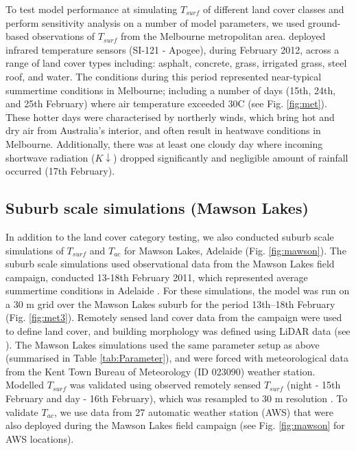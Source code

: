 \documentclass[gmd, manuscript]{copernicus}
\begin{document}
To test model performance at simulating $T_{surf}$ of different land cover classes and perform sensitivity analysis on a number of model parameters, we used ground-based observations of $T_{surf}$ from the Melbourne metropolitan area. \cite{Coutts2016a} deployed infrared temperature sensors (SI-121 - Apogee), during February 2012, across a range of land cover types including: asphalt, concrete, grass, irrigated grass, steel roof, and water. The conditions during this period represented near-typical summertime conditions in Melbourne; including a number of days (15th, 24th, and 25th February) where air temperature exceeded 30\degree C (see Fig. \ref{fig:met}). These hotter days were characterised by northerly winds, which bring hot and dry air from Australia's interior, and often result in heatwave conditions in Melbourne. Additionally, there was at least one cloudy day where incoming shortwave radiation (\ensuremath{K\downarrow}) dropped significantly and negligible amount of rainfall occurred (17th February). 




\subsection{Suburb scale simulations (Mawson Lakes)}\label{sec:suburbsim} 
 
In addition to the land cover category testing, we also conducted suburb scale simulations of $T_{surf}$ and $T_{ac}$ for Mawson Lakes, Adelaide (Fig. \ref{fig:mawson}). The suburb scale simulations used observational data from the Mawson Lakes field campaign, conducted 13-18th February 2011, which represented average summertime conditions in Adelaide \citep{Broadbent2017}. For these simulations, the model was run on a 30 m grid over the Mawson Lakes suburb for the period 13th--18th February (Fig. \ref{fig:met3}).  Remotely sensed land cover data from the campaign were used to define land cover, and building morphology was defined using LiDAR data (see \cite{Broadbent2017}). The Mawson Lakes simulations used the same parameter setup as above (summarised in Table \ref{tab:Parameter}), and were forced with meteorological data from the Kent Town Bureau of Meteorology (ID 023090) weather station. Modelled $T_{surf}$ was validated using observed remotely sensed $T_{surf}$ (night - 15th February and day - 16th February), which was resampled to 30 m resolution \citep{Broadbent2017}. To validate $T_{ac}$, we use data from 27 automatic weather station (AWS) that were also deployed during the Mawson Lakes field campaign (see Fig. \ref{fig:mawson} for AWS locations). 
 
\end{document}
